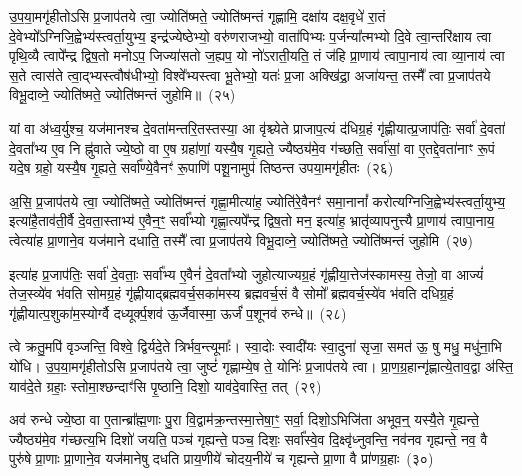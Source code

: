 {\anuvakamend[{जु॒हूरथो॒ ब्रह्म॑ स्रु॒चाꣳ स॒प्तद॑श च}]}%

उ॒प॒या॒मगृ॑हीतो\-ऽसि प्र॒जा\-प॑तये त्वा॒ ज्योति॑ष्मते॒ ज्योति॑ष्मन्तं गृह्णामि॒ दक्षा॑य दक्ष॒वृधे॑ रा॒तं दे॒वेभ्यो᳚\-ऽग्निजि॒ह्वेभ्य॑\-स्त्वर्ता॒युभ्य॒ इन्द्र॑ज्येष्ठेभ्यो॒ वरु॑णराजभ्यो॒ वाता॑पिभ्यः प॒र्जन्या᳚त्मभ्यो दि॒वे त्वा॒न्तरि॑क्षाय त्वा पृथि॒व्यै त्वापे᳚न्द्र द्विष॒तो मनो\-ऽप॒ जिज्या॑सतो ज॒ह्यप॒ यो नो॑\-ऽराती॒यति॒ तं ज॑हि प्रा॒णाय॑ त्वापा॒नाय॑ त्वा व्या॒नाय॑ त्वा स॒ते त्वास॑ते त्वा॒द्भ्यस्त्वौष॑धीभ्यो॒ विश्वे᳚भ्यस्त्वा भू॒तेभ्यो॒ यतः॑ प्र॒जा अक्खि॑द्रा॒ अजा॑यन्त॒ तस्मै᳚ त्वा प्र॒जा\-प॑तये विभू॒दाव्ने॒ ज्योति॑ष्मते॒ ज्योति॑ष्मन्तं जुहोमि॥~(२५)

{\anuvakamend[{ओष॑धीभ्य॒श्चतु॑र्दश च}]}%

यां वा अ॑ध्व॒र्युश्च॒ यज॑मानश्च दे॒वता॑मन्तरि॒तस्तस्या॒ आ वृ॑श्च्येते प्राजाप॒त्यं द॑धिग्र॒हं गृ॑ह्णीयात्प्र॒जा\-प॑तिः॒ सर्वा॑ दे॒वता॑ दे॒वता᳚भ्य ए॒व नि ह्नु॑वाते ज्ये॒ष्ठो वा ए॒ष ग्रहा॑णां॒ यस्यै॒ष गृ॒ह्यते॒ ज्यैष्ठ्य॑मे॒व ग॑च्छति॒ सर्वा॑सां॒ वा ए॒तद्दे॒वता॑नाꣳ रू॒पं यदे॒ष ग्रहो॒ यस्यै॒ष गृ॒ह्यते॒ सर्वा᳚ण्ये॒वैनꣳ॑ रू॒पाणि॑ पशू॒नामुप॑ तिष्ठन्त उपया॒मगृ॑हीतः~(२६)

अ॒सि॒ प्र॒जा\-प॑तये त्वा॒ ज्योति॑ष्मते॒ ज्योति॑ष्मन्तं गृह्णा॒मीत्या॑ह॒ ज्योति॑रे॒वैनꣳ॑ समा॒नानां᳚ करोत्यग्निजि॒ह्वेभ्य॑स्त्वर्ता॒युभ्य॒ इत्या॑है॒ताव॑ती॒र्वै दे॒वता॒स्ताभ्य॑ ए॒वैन॒ꣳ॒ सर्वा᳚भ्यो गृह्णा॒त्यपे᳚न्द्र द्विष॒तो मन॒ इत्या॑ह॒ भ्रातृ॑व्यापनुत्त्यै प्रा॒णाय॑ त्वापा॒नाय॒ त्वेत्या॑ह प्रा॒णाने॒व यज॑माने दधाति॒ तस्मै᳚ त्वा प्र॒जा\-प॑तये विभू॒दाव्ने॒ ज्योति॑ष्मते॒ ज्योति॑ष्मन्तं जुहोमि~(२७)

इत्या॑ह प्र॒जा\-प॑तिः॒ सर्वा॑ दे॒वताः॒ सर्वा᳚भ्य ए॒वैनं॑ दे॒वता᳚भ्यो जुहोत्याज्यग्र॒हं गृ॑ह्णीया॒त्तेज॑स्कामस्य॒ तेजो॒ वा आज्यं॑ तेज॒स्व्ये॑व भ॑वति सोमग्र॒हं गृ॑ह्णीयाद्ब्रह्मवर्च॒सका॑मस्य ब्रह्मवर्च॒सं वै सोमो᳚ ब्रह्मवर्च॒स्ये॑व भ॑वति दधिग्र॒हं गृ॑ह्णीयात्प॒शुका॑म॒स्योर्ग्वै दध्यूर्क्प॒शव॑ ऊ॒र्जैवास्मा॒ ऊर्जं॑ प॒शूनव॑ रुन्धे॥~(२८)

{\anuvakamend[{उ॒प॒या॒मगृ॑हीतो जुहोमि॒ त्रिच॑त्वारिꣳशच्च}]}%

त्वे क्रतु॒मपि॑ वृञ्जन्ति॒ विश्वे॒ द्विर्यदे॒ते त्रिर्भव॒न्त्यूमाः᳚। स्वा॒दोः स्वादी॑यः स्वा॒दुना॑ सृजा॒ समत॑ ऊ॒ षु मधु॒ मधु॑ना॒भि यो॑धि। उ॒प॒या॒मगृ॑हीतो\-ऽसि प्र॒जा\-प॑तये त्वा॒ जुष्टं॑ गृह्णाम्ये॒ष ते॒ योनिः॑ प्र॒जा\-प॑तये त्वा। प्रा॒ण॒ग्र॒हान्गृ॑ह्णात्ये॒ताव॒द्वा अ॑स्ति॒ याव॑दे॒ते ग्रहाः॒ स्तोमा॒श्छन्दाꣳ॑सि पृ॒ष्ठानि॒ दिशो॒ याव॑दे॒वास्ति॒ तत्~(२९)

अव॑ रुन्धे ज्ये॒ष्ठा वा ए॒तान्ब्रा᳚ह्म॒णाः पु॒रा वि॒द्वाम॑क्र॒न्तस्मा॒त्तेषा॒ꣳ॒ सर्वा॒ दिशो॒\-ऽभिजि॑ता अभूव॒न्॒ यस्यै॒ते गृ॒ह्यन्ते॒ ज्यैष्ठ्य॑मे॒व ग॑च्छत्य॒भि दिशो॑ जयति॒ पञ्च॑ गृह्यन्ते॒ पञ्च॒ दिशः॒ सर्वा᳚स्वे॒व दि॒क्ष्वृ॑ध्नुवन्ति॒ नव॑नव गृह्यन्ते॒ नव॒ वै पुरु॑षे प्रा॒णाः प्रा॒णाने॒व यज॑मानेषु दधति प्राय॒णीये॑ चोदय॒नीये॑ च गृह्यन्ते प्रा॒णा वै प्रा॑णग्र॒हाः~(३०)

